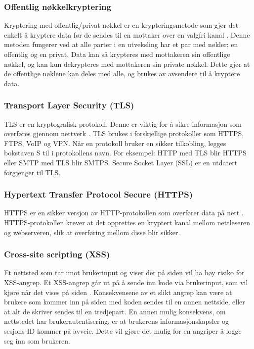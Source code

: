 \subsubsection{Offentlig nøkkelkryptering}
\label{sec:analysis-security-public_key-cryptography}
Kryptering med offentlig/privat-nøkkel er en krypteringsmetode som gjør det enkelt å kryptere data før de sendes til en mottaker over en valgfri kanal \cite[s.~58-60]{NattTomHeine2015Datasikkerhet}. Denne metoden fungerer ved at alle parter i en utveksling har et par med nøkler; en offentlig og en privat. Data kan så krypteres med mottakeren sin offentlige nøkkel, og kan kun dekrypteres med mottakeren sin private nøkkel. Dette gjør at de offentlige nøklene kan deles med alle, og brukes av avsendere til å kryptere data.
 
\subsubsection{Transport Layer Security (TLS)}
\label{sec:analysis-security-tls}
TLS er en kryptografisk protokoll. Denne er viktig for å sikre informasjon som overføres gjennom nettverk \cite{thomas2000ssl}. TLS brukes i forskjellige protokoller som HTTPS, FTPS, VoIP og VPN.
Når en protokoll bruker en sikker tilkobling, legges bokstaven S til i protokollens navn. For eksempel: HTTP med TLS blir HTTPS eller SMTP med TLS blir SMTPS.
Secure Socket Layer (SSL) er en utdatert forgjenger til TLS.
 
\subsubsection{Hypertext Transfer Protocol Secure (HTTPS)}
\label{sec:analysis-security-https}
HTTPS er en sikker versjon av HTTP-protokollen som overfører data på nett \cite{rfc26161999hypertext}. HTTPS-protokollen krever at det opprettes en kryptert kanal mellom nettleseren og webserveren, slik at overføring mellom disse blir sikker.

\subsubsection{Cross-site scripting (XSS)}
\label{sec:analysis-security-xss}
Et nettsted som tar imot brukerinput og viser det på siden vil ha høy risiko for XSS-angrep.
Et XSS-angrep går ut på å sende inn kode via brukerinput, som vil kjøre når det vises på siden \cite[s.~179-183]{NattTomHeine2015Datasikkerhet}. Konsekvensene av et slikt angrep kan være at brukere som kommer inn på siden med koden sendes til en annen nettside, eller at alt de skriver sendes til en tredjepart. En annen mulig konsekvens, om nettstedet har brukerautentisering, er at brukerens informasjonskapsler og sesjons-ID kommer på avveie. Dette vil gjøre det mulig for en angriper å logge seg inn som brukeren.

